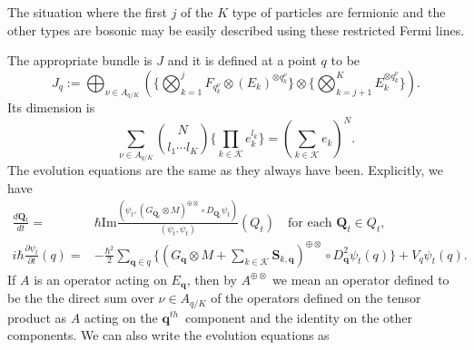 \documentclass[11pt]{article}
\theoremstyle{remark}
\begin{document}
The situation where the first $j$ of the $K$ type of
particles are fermionic and the other types are bosonic may be easily
described using these restricted Fermi lines. 


The appropriate bundle is $J$ and it is defined at a point $\ensuremath{q}$ to
be 
\[
J_{\ensuremath{q}} \ensuremath{:=} \bigoplus_{\ensuremath{\nu} \in \ensuremath{A_{q/K}}} (\{\bigotimes_{k =1}^j 
F_{\ensuremath{\ensuremath{q}_k^{\nu}}} \otimes (E_k)^{\otimes \ensuremath{\ensuremath{q}_k^{\nu}} }\} 
\otimes \{\bigotimes_{k =j+1}^K 
 E_k^{\otimes \ensuremath{\ensuremath{q}_k^{\nu}}}\}).\]
 Its dimension is 
\[
\sum_{\ensuremath{\nu} \in \ensuremath{A_{q/K}}}
\binom{N}{l_1\cdots l_K} \{ \prod_{k \in \ensuremath{\mathcal{K}}} e_k^{l_k}\} = 
(\sum_{k \in \ensuremath{\mathcal{K}} } e_k)^N.
\] 
The evolution 
equations are the same as they always have been. Explicitly, we have
\begin{subequations}
\begin{align} 
\ensuremath{\frac{d{\boldsymbol{Q}_t}}{d{t}}} =&  \hbar  \textrm{Im}
\frac {\ensuremath{({\ensuremath{\psi}_t}, { (G_{\boldsymbol{Q}_t} \otimes M)^{\oplus\otimes} \circ
D_{\boldsymbol{Q}_t} \ensuremath{\psi}_t})}}
{\ensuremath{({\ensuremath{\psi}_t}, {\ensuremath{\psi}_t})}} (Q_t)
  \quad \text{for each $\boldsymbol{Q}_t \in Q_t$,} \\ 
i \hbar \ensuremath{\frac{\partial {\ensuremath{\psi}_t}}{\partial {t}}}  (\ensuremath{q}) =&  - \frac{\hbar^2}{2} \sum\limits_{ \ensuremath{\boldsymbol{q}} \in \ensuremath{q}}
 \{ (G_{\ensuremath{\boldsymbol{q}}} \otimes M + \sum_{k \in \ensuremath{\mathcal{K}}} \ensuremath{\boldsymbol{S}}_{k, \ensuremath{\boldsymbol{q}}}
)^{\oplus\otimes} 
\circ D^2_{\ensuremath{\boldsymbol{q}}} \ensuremath{\psi}_t (\ensuremath{q}) \} + 
V_{\ensuremath{q}} \ensuremath{\psi}_t (\ensuremath{q}) 
. 
\end{align}
\end{subequations}
If $A$ is an operator acting on $E_{\ensuremath{\boldsymbol{q}}}$, then by $A^{\oplus \otimes}$ we
mean an operator defined to be the the direct sum over $\ensuremath{\nu} \in
\ensuremath{A_{q/K}}$ of the operators defined on the tensor product as $A$
acting on the \ensuremath{{\ensuremath{\boldsymbol{q}}}^{th}}\ component and the identity on the other
components. 
We can also write the evolution equations as 
\end{document}
